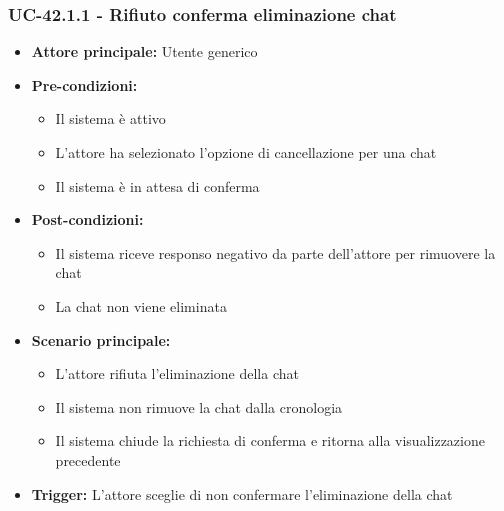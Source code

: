 \documentclass[a4paper,12pt]{article}
\begin{document}
\subsubsection{UC-42.1.1 - Rifiuto conferma eliminazione chat} \label{subsec:UC-42.1.1}
\begin{itemize}
    \item \textbf{Attore principale:} Utente generico
    \item \textbf{Pre-condizioni:}
    \begin{itemize}
        \item Il sistema è attivo
        \item L'attore ha selezionato l'opzione di cancellazione per una chat
        \item Il sistema è in attesa di conferma
    \end{itemize}
    \item \textbf{Post-condizioni:}
    \begin{itemize}
        \item Il sistema riceve responso negativo da parte dell'attore per rimuovere la chat
        \item La chat non viene eliminata
    \end{itemize}
    \item \textbf{Scenario principale:} 
    \begin{itemize}
        \item L'attore rifiuta l'eliminazione della chat
        \item Il sistema non rimuove la chat dalla cronologia
        \item Il sistema chiude la richiesta di conferma e ritorna alla visualizzazione precedente
    \end{itemize}
    \item \textbf{Trigger:} L'attore sceglie di non confermare l'eliminazione della chat
\end{itemize}

\end{document}
